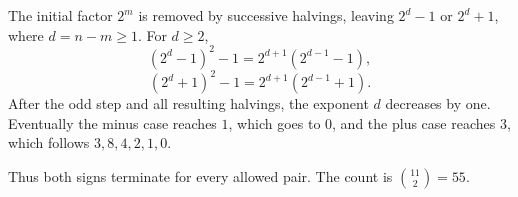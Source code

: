 The initial factor $2^m$ is removed by successive halvings, leaving $2^d-1$ or $2^d+1$, where $d=n-m\ge1$. For $d\ge2$,
\[
(2^d-1)^2-1=2^{d+1}(2^{d-1}-1),
\]
\[
(2^d+1)^2-1=2^{d+1}(2^{d-1}+1).
\]
After the odd step and all resulting halvings, the exponent $d$ decreases by one. Eventually the minus case reaches $1$, which goes to $0$, and the plus case reaches $3$, which follows $3,8,4,2,1,0$.

Thus both signs terminate for every allowed pair. The count is $\boxed{\binom{11}{2}=55}$.
